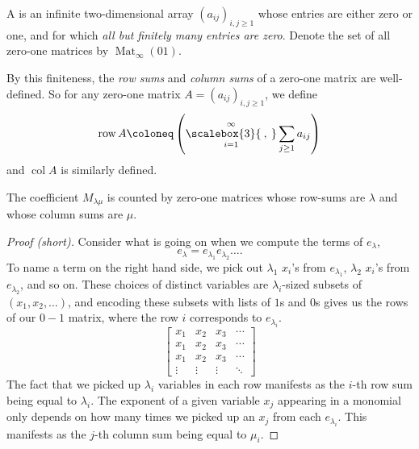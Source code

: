 \documentclass{article}
\newcommand{\bigcomma}{\ensuremath{\mathop{\scalebox{3}{\:,\:}}\limits}}
\DeclareMathOperator{\row}{row}
\DeclareMathOperator{\col}{col}
\DeclareMathOperator{\Mat}{Mat}
\begin{document}
\begin{definition}
    A  is an infinite two-dimensional array $(a_{ij})_{i,j \geq 1}$ whose entries are either zero or one, and for which \textit{all but finitely many entries are zero}.
    Denote the set of all zero-one matrices by $\Mat_\infty(01)$.

    By this finiteness, the \textit{row sums} and \textit{column sums} of a zero-one matrix are well-defined.
    So for any zero-one matrix $A = (a_{ij})_{i,j \geq 1}$, we define
    \[
        \row A \coloneq \left(\bigcomma_{i = 1}^\infty \sum_{j \geq 1} a_{ij}\right)
    \]
    and $\col A$ is similarly defined.
\end{definition}

\begin{theorem} \label{thm:e2mCombInterpretation}
    The coefficient $M_{\lambda\mu}$ is counted by zero-one matrices whose row-sums are $\lambda$ and whose column sums are $\mu$.
\end{theorem}

\begin{proof}[Proof (short)]
    Consider what is going on when we compute the terms of $e_\lambda$,
    \[
        e_\lambda = e_{\lambda_1}e_{\lambda_2}\ldots.
    \]
    To name a term on the right hand side, we pick out $\lambda_1$ $x_i$'s from $e_{\lambda_1}$, $\lambda_2$ $x_i$'s from $e_{\lambda_2}$, and so on.
    These choices of distinct variables are $\lambda_i$-sized subsets of $(x_1, x_2, \ldots)$, and encoding these subsets with lists of $1$s and $0$s gives us the rows of our $0-1$ matrix, where the row $i$ corresponds to $e_{\lambda_i}$.     
    \[
        \begin{bmatrix}
            x_1 & x_2 & x_3 & \cdots \\
            x_1 & x_2 & x_3 & \cdots \\
            x_1 & x_2 & x_3 & \cdots \\
            \vdots & \vdots & \vdots & \ddots 
        \end{bmatrix}
    \]
    The fact that we picked up $\lambda_i$ variables in each row manifests as the $i$-th row sum being equal to $\lambda_i$.
The exponent of a given variable $x_j$ appearing in a monomial only depends on how many times we picked up an $x_j$ from each $e_{\lambda_i}$. 
This manifests as the $j$-th column sum being equal to $\mu_i$.
\end{proof}
\end{document}
